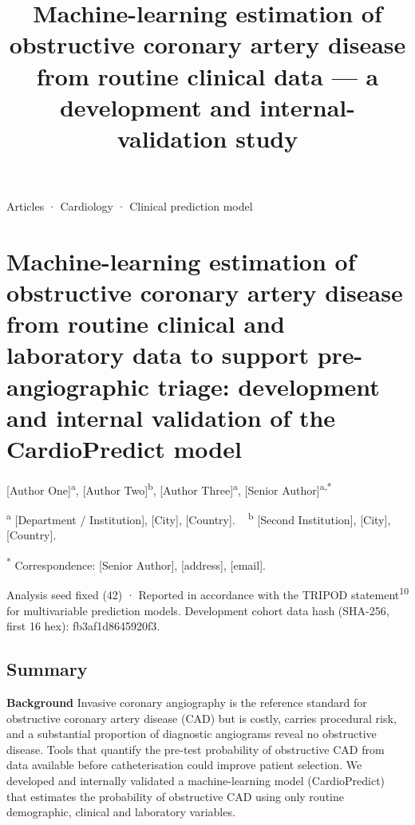 \documentclass[
  english,
  11pt,
]{article}
\title{Machine-learning estimation of obstructive coronary artery
disease from routine clinical data --- a development and
internal-validation study}
\author{}
\date{}
\begin{document}
\maketitle

Articles · Cardiology · Clinical prediction model

\section{Machine-learning estimation of obstructive coronary artery
disease from routine clinical and laboratory data to support
pre-angiographic triage: development and internal validation of the
CardioPredict
model}\label{machine-learning-estimation-of-obstructive-coronary-artery-disease-from-routine-clinical-and-laboratory-data-to-support-pre-angiographic-triage-development-and-internal-validation-of-the-cardiopredict-model}

{[}Author One{]}\textsuperscript{a}, {[}Author
Two{]}\textsuperscript{b}, {[}Author Three{]}\textsuperscript{a},
{[}Senior Author{]}\textsuperscript{a,*}

\textsuperscript{a} {[}Department / Institution{]}, {[}City{]},
{[}Country{]}. ~ \textsuperscript{b} {[}Second Institution{]},
{[}City{]}, {[}Country{]}.

\textsuperscript{*} Correspondence: {[}Senior Author{]}, {[}address{]},
{[}email{]}.

Analysis seed fixed (42) · Reported in accordance with the TRIPOD
statement\textsuperscript{10} for multivariable prediction models. Development cohort data
hash (SHA-256, first 16 hex): {fb3af1d8645920f3}.

\subsection{Summary}\label{summary}

\textbf{Background} Invasive coronary angiography is the reference
standard for obstructive coronary artery disease (CAD) but is costly,
carries procedural risk, and a substantial proportion of diagnostic
angiograms reveal no obstructive disease. Tools that quantify the
pre-test probability of obstructive CAD from data available before
catheterisation could improve patient selection. We developed and
internally validated a machine-learning model (CardioPredict) that
estimates the probability of obstructive CAD using only routine
demographic, clinical and laboratory variables.
\end{document}
